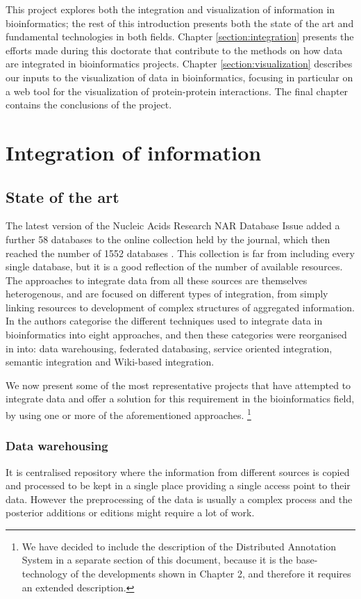 This project explores both the integration and visualization of information in bioinformatics; the rest of this introduction presents both the state of the art and fundamental technologies in both fields. Chapter \ref{section:integration} presents the efforts made during this doctorate that contribute to the methods on how data are integrated in bioinformatics projects. Chapter \ref{section:visualization} describes our inputs to the visualization of data in bioinformatics, focusing in particular on a web tool for the visualization of protein-protein interactions. The final chapter contains the conclusions of the project.

\section{Integration of information}
\subsection{State of the art}
The latest version of the Nucleic Acids Research NAR Database Issue added a further 58 databases to the online collection held by the journal, which then reached the number of 1552 databases \cite{FER2014}. This collection is far from including every single database, but it is  a good reflection of the number of available resources.
The approaches to integrate data from all these sources are themselves heterogenous, and are focused on different types of integration, from simply linking resources to development of complex structures of aggregated information. In \cite{GOB2008} the authors categorise the different techniques used to integrate data in bioinformatics into eight approaches, and then these categories were reorganised in \cite{ZHA2011b} into: data warehousing, federated databasing, service oriented integration, semantic integration and Wiki-based integration.

We now present some of the most representative projects that have attempted to integrate data and offer a solution for this requirement in the bioinformatics field, by using one or more of the aforementioned approaches. \footnote{We have decided to include the description of the Distributed Annotation System in a separate section of this document, because it is the base-technology of the developments shown in Chapter 2, and therefore it requires an extended description.}

\subsubsection{Data warehousing} \label{subsec:dwh}
It is centralised repository where the information from different sources is copied and processed to be kept  in a single place providing a single access point to their data. However the preprocessing of the data is usually a complex process and the posterior additions or editions might require a lot of work.

